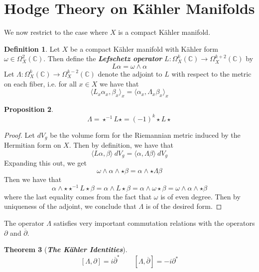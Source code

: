 \documentclass[psamsfonts, 12pt]{amsart}
\newtheorem{thm}{Theorem}[section]
\newtheorem{prop}[thm]{Proposition}
\theoremstyle{definition}
\newtheorem{defn}[thm]{Definition}
\theoremstyle{remark}
\newcommand{\ib}[1]{\textbf{\textit{#1}}}
\newcommand{\C}{\mathbb{C}}
\newcommand{\dbar}{\overline{\partial}}
\newcommand{\inv}{^{-1}}
\begin{document}
\section{Hodge Theory on K\"ahler Manifolds}
%
We now restrict to the case where $X$ is a compact K\"ahler manifold.
%
\begin{defn}
Let $X$ be a compact K\"ahler manifold with K\"ahler form $\omega \in \Omega^2_X(\C)$.
Then define the \ib{Lefschetz operator} $L : \Omega^k_X(\C) \to \Omega^{k+2}_X(\C)$ by
\[
L\alpha = \omega \wedge \alpha
\]
Let $\Lambda : \Omega^k_X(\C) \to \Omega^{k-2}_X(\C)$ denote the adjoint to $L$ with
respect to the metric on each fiber, i.e. for all $x \in X$ we have that
\[
\langle L_x\alpha_x,\beta_x\rangle_x = \langle\alpha_x,\Lambda_x\beta_x\rangle_x
\]
\end{defn}
%
\begin{prop}
\[
\Lambda = \star\inv L\star = (-1)^k\star L\star
\]
\end{prop}
%
\begin{proof}
Let $dV_g$ be the volume form for the Riemannian metric induced by the Hermitian form
on $X$. Then by definition, we have that
\[
\langle L\alpha,\beta\rangle~dV_g = \langle\alpha,\Lambda\beta\rangle~dV_g
\]
Expanding this out, we get
\[
\omega\wedge\alpha\wedge\star\beta = \alpha\wedge\star\Lambda\beta
\]
Then we have that
\[
\alpha\wedge\star\star\inv L\star\beta = \alpha\wedge L\star\beta
=\alpha\wedge\omega\star\beta = \omega\wedge\alpha\wedge\star\beta
\]
where the last equality comes from the fact that $\omega$ is of even degree. Then
by uniqueness of the adjoint, we conclude that $\Lambda$ is of the desired form.
\end{proof}
%
The operator $\Lambda$ satisfies very important commutation relations with
the operators $\partial$ and $\dbar$.
%
\begin{thm}[\ib{The K\"ahler Identities}]
\[
[\Lambda,\partial] = i\dbar^* \qquad [\Lambda,\dbar] = -i\partial^*
\]
\end{thm}
%
\end{document}
